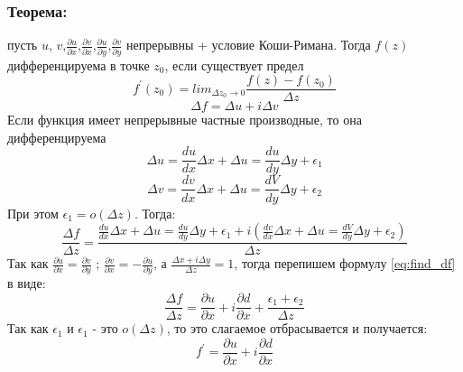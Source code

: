 \documentclass{article}
\begin{document}
            \subsubsection*{Теорема:}
            пусть $u$, $v$,$\frac{\partial u}{\partial x}$,$\frac{\partial v}{\partial x}$,$\frac{\partial u}{\partial y}$,$\frac{\partial v}{\partial y}$ непрерывны + условие Коши-Римана. Тогда $f(z)$ дифференцируема в точке $z_{0}$, если существует предел 
            \begin{equation}
              f^{\prime}(z_{0})=lim_{\Delta z_{0} \rightarrow 0} \frac{f(z)-f(z_{0})}{\Delta z}
            \end{equation}
            \bigskip
            \begin{equation}
              \Delta f= \Delta u + i \Delta v
            \end{equation}
            Если функция имеет непрерывные частные производные, то она дифференцируема
            \begin{equation}
              \Delta u=\frac{d u}{d x} \Delta x + \Delta u=\frac{d u}{d y} \Delta y + \epsilon_{1}
            \end{equation}
            \begin{equation}
              \Delta v=\frac{d v}{d x} \Delta x + \Delta u=\frac{d V}{d y} \Delta y + \epsilon_{2}
            \end{equation}
            При этом $\epsilon_{1}=o(\Delta z)$. Тогда:
            \begin{equation}\label{eq:find_df}
              \frac{\Delta f}{\Delta z}=\frac{\frac{d u}{d x} \Delta x + \Delta u=\frac{d u}{d y} \Delta y + \epsilon_{1} + i (\frac{d v}{d x} \Delta x + \Delta u=\frac{d V}{d y} \Delta y + \epsilon_{2})}{\Delta z}
            \end{equation}
            Так как $\frac{\partial u}{\partial x} = \frac{\partial v}{\partial y}$ ; $\frac{\partial v}{\partial x} = - \frac{\partial u}{\partial y}$, а $\frac{\Delta x+i \Delta y}{\Delta z}=1$, тогда перепишем формулу \ref{eq:find_df}  в виде:
            \begin{equation}
              \frac{\Delta f}{\Delta z}=\frac{\partial u}{\partial x} + i \frac{\partial d}{\partial x}+ \frac{\epsilon_{1}+\epsilon_{2}}{\Delta z}
            \end{equation}
            Так как $\epsilon_{1}$ и $\epsilon_{1}$ - это $o(\Delta z)$, то это слагаемое отбрасывается и получается:
              \begin{equation}
                f^{\prime}=\frac{\partial u}{\partial x} + i \frac{\partial d}{\partial x}
              \end{equation}
\end{document}
